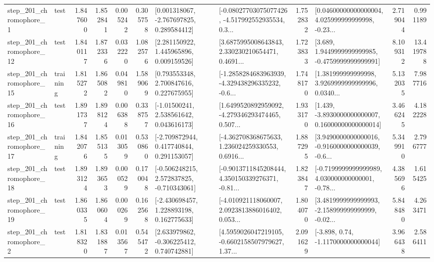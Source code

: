 \begin{tabular}{llrrrrllrlrr}
   step\_201\_chromophore\_1 &      test &      1.847600 &    1.852841 &      0.005242 &  0.305758 &    [0.001318067, -2.767697825, 0.289584412] &  [-0.08027703075077426, -4.517992552935534, 0.3... &       1.752832 &  [0.04600000000000004, 4.025999999999998, -0.23... &            2.719044 &          0.991189 \\
  step\_201\_chromophore\_12 &      test &      1.840117 &    1.872336 &      0.032220 &  1.082576 &     [2.281150922, 1.445965896, 0.009159526] &  [3.6875995008643843, 2.330230210654471, 0.4691... &       1.723833 &   [3.689, 1.9449999999999985, -0.4759999999999991] &            8.109312 &         13.419788 \\
  step\_201\_chromophore\_15 &  training &      1.815272 &    1.865082 &      0.049810 &  1.589069 &     [0.793553348, 2.700847616, 0.227675955] &  [-1.2858284683963939, -4.329438296335232, -0.6... &       1.748170 &  [1.381999999999998, 3.9269999999999996, 0.0340... &            5.132035 &          7.987716 \\
  step\_201\_chromophore\_16 &      test &      1.891737 &    1.898124 &      0.006388 &  0.338757 &     [-1.01500241, 2.538561642, 0.043616173] &  [1.6499520892959092, -4.279346293474465, 0.507... &       1.933170 &  [1.439, -3.8930000000000007, 0.16000000000000014] &            3.466245 &          4.182228 \\
  step\_201\_chromophore\_17 &  training &      1.842076 &    1.855135 &      0.013059 &  0.530860 &    [-2.709872944, 0.417740844, 0.291153057] &  [-4.362708368675633, 1.236024259330553, 0.6916... &       1.887295 &  [3.9490000000000016, -0.9160000000000039, -0.6... &            5.349910 &          2.796777 \\
  step\_201\_chromophore\_18 &      test &      1.893124 &    1.893653 &      0.000529 &  0.170048 &   [-0.506248215, 2.572837825, -0.710343061] &  [-0.9013711845208444, 4.350150339276371, -0.81... &       1.823847 &  [-0.7199999999999989, 4.030000000000001, -0.78... &            4.385696 &          1.615425 \\
  step\_201\_chromophore\_19 &      test &      1.860335 &    1.860604 &      0.000269 &  0.162568 &    [-2.430698457, 1.228893198, 0.162775633] &  [-4.010921118060007, 2.0923813886016402, 0.053... &       1.804070 &  [3.4819999999999993, -2.158999999999999, -0.02... &            5.848480 &          4.263471 \\
   step\_201\_chromophore\_2 &      test &      1.818320 &    1.831887 &      0.013567 &  0.545472 &    [2.633979862, -0.306225412, 0.740742881] &  [4.5959026047219105, -0.6602158507979627, 1.37... &       2.091629 &                [-3.898, 0.74, -1.1170000000000044] &            3.966438 &          2.586411 \\

\end{tabular}
